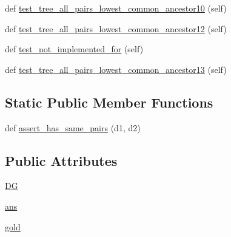 \begin{DoxyCompactItemize}
\item 
def \hyperlink{classnetworkx_1_1algorithms_1_1tests_1_1test__lowest__common__ancestors_1_1TestTreeLCA_a3ca8b4100c98e3fdbb92442747910d6e}{test\+\_\+tree\+\_\+all\+\_\+pairs\+\_\+lowest\+\_\+common\+\_\+ancestor10} (self)
\item 
def \hyperlink{classnetworkx_1_1algorithms_1_1tests_1_1test__lowest__common__ancestors_1_1TestTreeLCA_a87bbb6af7aab9fbb36ca534b974a32c8}{test\+\_\+tree\+\_\+all\+\_\+pairs\+\_\+lowest\+\_\+common\+\_\+ancestor12} (self)
\item 
def \hyperlink{classnetworkx_1_1algorithms_1_1tests_1_1test__lowest__common__ancestors_1_1TestTreeLCA_ae1bc4dd1d6d12ffc0b1b197239cf9065}{test\+\_\+not\+\_\+implemented\+\_\+for} (self)
\item 
def \hyperlink{classnetworkx_1_1algorithms_1_1tests_1_1test__lowest__common__ancestors_1_1TestTreeLCA_a285e6c0bf1f02f8b9b53e44a7b5e37bb}{test\+\_\+tree\+\_\+all\+\_\+pairs\+\_\+lowest\+\_\+common\+\_\+ancestor13} (self)
\end{DoxyCompactItemize}
\subsection*{Static Public Member Functions}
\begin{DoxyCompactItemize}
\item 
def \hyperlink{classnetworkx_1_1algorithms_1_1tests_1_1test__lowest__common__ancestors_1_1TestTreeLCA_a82b5d21d801c16426f7519e5a1a742ec}{assert\+\_\+has\+\_\+same\+\_\+pairs} (d1, d2)
\end{DoxyCompactItemize}
\subsection*{Public Attributes}
\begin{DoxyCompactItemize}
\item 
\hyperlink{classnetworkx_1_1algorithms_1_1tests_1_1test__lowest__common__ancestors_1_1TestTreeLCA_a58338db2f363ccb224762999f4ed48da}{DG}
\item 
\hyperlink{classnetworkx_1_1algorithms_1_1tests_1_1test__lowest__common__ancestors_1_1TestTreeLCA_a72fd75356d8e2d987ad9178929a2c280}{ans}
\item 
\hyperlink{classnetworkx_1_1algorithms_1_1tests_1_1test__lowest__common__ancestors_1_1TestTreeLCA_a34d3056c8ea11c4f85bff70764b21a0e}{gold}
\end{DoxyCompactItemize}


